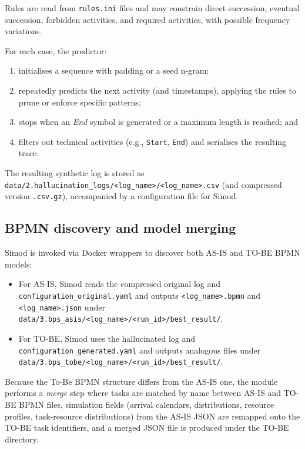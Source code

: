 \documentclass[a4paper,fleqn]{cas-sc}
\begin{document}
Rules are read from \verb|rules.ini| files and may constrain
direct succession, eventual succession, forbidden activities,
and required activities, with possible frequency variations.

For each case, the predictor:

\begin{enumerate}
  \item initialises a sequence with padding or a seed n-gram;
  \item repeatedly predicts the next activity (and timestamps),
  applying the rules to prune or enforce specific patterns;
  \item stops when an \emph{End} symbol is generated or a
  maximum length is reached; and
  \item filters out technical activities (e.g., \texttt{Start},
  \texttt{End}) and serialises the resulting trace.
\end{enumerate}

The resulting synthetic log is stored as
\verb|data/2.hallucination_logs/<log_name>/<log_name>.csv|
(and compressed version \verb|.csv.gz|), accompanied by a
configuration file for Simod.

\subsection{BPMN discovery and model merging}

Simod is invoked via Docker wrappers to discover both
AS-IS and TO-BE BPMN models:

\begin{itemize}
  \item For AS-IS, Simod reads the compressed original log and
  \verb|configuration_original.yaml| and outputs
  \verb|<log_name>.bpmn| and \verb|<log_name>.json| under
  \verb|data/3.bps_asis/<log_name>/<run_id>/best_result/|.
  \item For TO-BE, Simod uses the hallucinated log and
  \verb|configuration_generated.yaml| and outputs analogous
  files under \verb|data/3.bps_tobe/<log_name>/<run_id>/best_result/|.
\end{itemize}

Because the To-Be BPMN structure differs from the AS-IS one,
the module performs a \emph{merge} step where tasks are matched
by name between AS-IS and TO-BE BPMN files, simulation fields
(arrival calendars, distributions, resource profiles, task-resource
distributions) from the AS-IS JSON are remapped onto the TO-BE
task identifiers, and a merged JSON file is produced under the TO-BE directory.
\end{document}
